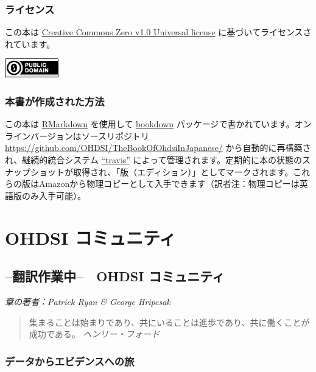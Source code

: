 \documentclass[
  11pt]{book}
\theoremstyle{definition}
\theoremstyle{definition}
\theoremstyle{definition}
\theoremstyle{definition}
\theoremstyle{remark}
\begin{document}
\section*{ライセンス}\label{ux30e9ux30a4ux30bbux30f3ux30b9}

この本は \href{http://creativecommons.org/publicdomain/zero/1.0/}{Creative Commons Zero v1.0 Universal license} に基づいてライセンスされています。

\includegraphics{images/Preface/cc0.png}

\section*{本書が作成された方法}\label{ux672cux66f8ux304cux4f5cux6210ux3055ux308cux305fux65b9ux6cd5}

この本は \href{https://rmarkdown.rstudio.com}{RMarkdown} を使用して \href{https://bookdown.org}{bookdown} パッケージで書かれています。オンラインバージョンはソースリポジトリ \url{https://github.com/OHDSI/TheBookOfOhdsiInJapanese/} から自動的に再構築され、継続的統合システム \href{http://travis-ci.org/}{``travis''} によって管理されます。定期的に本の状態のスナップショットが取得され、「版（エディション）」としてマークされます。これらの版はAmazonから物理コピーとして入手できます（訳者注：物理コピーは英語版のみ入手可能）。

\mainmatter

\part{OHDSI コミュニティ}\label{part-ohdsi-ux30b3ux30dfux30e5ux30cbux30c6ux30a3}

\chapter{--翻訳作業中--　OHDSI コミュニティ}\label{OhdsiCommunity}

\emph{章の著者：Patrick Ryan \& George Hripcsak}

\begin{quote}
集まることは始まりであり、共にいることは進歩であり、共に働くことが成功である。 \emph{ヘンリー・フォード}
\end{quote}

\section{データからエビデンスへの旅}\label{ux30c7ux30fcux30bfux304bux3089ux30a8ux30d3ux30c7ux30f3ux30b9ux3078ux306eux65c5}
\end{document}
